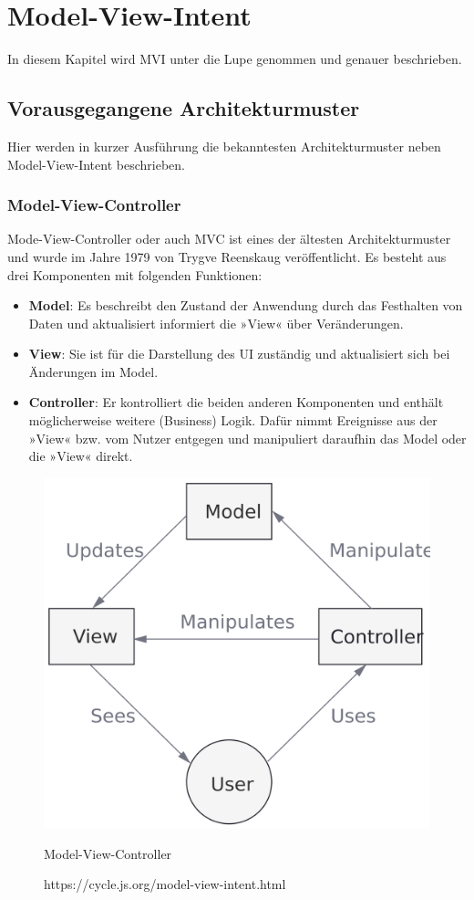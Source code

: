 \section{Model-View-Intent}
\label{sec:model-view-intent}
In diesem Kapitel wird MVI unter die Lupe genommen und genauer beschrieben.

\subsection{Vorausgegangene Architekturmuster}
Hier werden in kurzer Ausführung die bekanntesten Architekturmuster neben Model-View-Intent beschrieben.

\subsubsection{Model-View-Controller}
Mode-View-Controller oder auch MVC ist eines der ältesten Architekturmuster und wurde im Jahre 1979 von Trygve Reenskaug veröffentlicht.
\cite{theModelViewEditorTrygveReenskaug1979, modelsViewsControllersTrygveReenskaug1979}
Es besteht aus drei Komponenten mit folgenden Funktionen:
\begin{itemize}
	\item \textbf{Model}: Es beschreibt den Zustand der Anwendung durch das Festhalten von Daten und aktualisiert informiert die »View« über Veränderungen.
	\item \textbf{View}: Sie ist für die Darstellung des UI zuständig und aktualisiert sich bei Änderungen im Model.
	\item \textbf{Controller}:  Er kontrolliert die beiden anderen Komponenten und enthält möglicherweise weitere (Business) Logik. Dafür nimmt Ereignisse aus der »View« bzw. vom Nutzer entgegen und manipuliert daraufhin das Model oder die »View« direkt. 
\end{itemize}
\begin{figure}[ht]
	\centering
	\includegraphics[height=0.5\textwidth]{./images/mvc-diagram.png}
	\caption{Model-View-Controller}
	\caption*{https://cycle.js.org/model-view-intent.html}
	\label{fig:mvc}
\end{figure}
\clearpage

